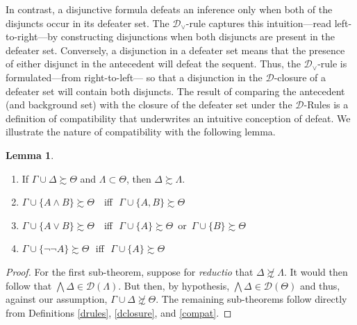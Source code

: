 \documentclass{article}
\theoremstyle{definition}
\theoremstyle{definition}
\theoremstyle{definition}
\newtheorem{lemma}{Lemma}
\theoremstyle{definition}
\theoremstyle{remark}
\theoremstyle{definition}
\theoremstyle{definition}
\begin{document}
In contrast, a disjunctive formula defeats an inference only when both of the disjuncts occur in its defeater set.  The $ \mathcal{D}_{\vee}$-rule captures this intuition---read left-to-right---by constructing disjunctions when both disjuncts are present in the defeater set. Conversely, a disjunction in a defeater set means that the presence of either disjunct in the antecedent will defeat the sequent. Thus, the $ \mathcal{D}_{\vee}$-rule is formulated---from right-to-left--- so that a disjunction in the $ \mathcal{D}$-closure of a defeater set will contain both disjuncts. The result of comparing the antecedent (and background set) with the closure of the defeater set under the $ \mathcal{D}$-Rules is a definition of compatibility that underwrites an intuitive conception of defeat. We illustrate the nature of compatibility with the following lemma.

\begin{lemma}\label{compatrel}
	
	\begin{enumerate}
		\item If $ \Gamma \cup \Delta \succsim \Theta$ and $ \Lambda \subset \Theta $, then $ \Delta \succsim \Lambda$.
		\item $ \Gamma \cup \{A \wedge B\} \succsim \Theta $ \,\, iff\,\,  $ \Gamma \cup \{A, B\} \succsim \Theta $
		\item $ \Gamma \cup \{A \vee B\} \succsim \Theta $ \,\, iff\,\,  $ \Gamma \cup \{A\} \succsim \Theta $ \,or\, $ \Gamma \cup \{B\} \succsim \Theta$
		\item $ \Gamma \cup \{\neg\neg A\} \succsim \Theta $ \,\,iff\,\,  $ \Gamma \cup \{A\} \succsim \Theta $
	\end{enumerate}
	
	\begin{proof}
		For the first sub-theorem, suppose for \textit{reductio} that $ \Delta \not\succsim \Lambda$. It would then follow that $ \bigwedge\Delta \in \mathcal{D}(\Lambda) $. But then, by hypothesis, $ \bigwedge\Delta \in \mathcal{D}(\Theta) $ and thus, against our assumption, $ \Gamma \cup \Delta \not\succsim \Theta $.  The remaining sub-theorems follow directly from Definitions \ref{drules}, \ref{dclosure}, and \ref{compat}.
	\end{proof}
	
\end{lemma}
\end{document}
